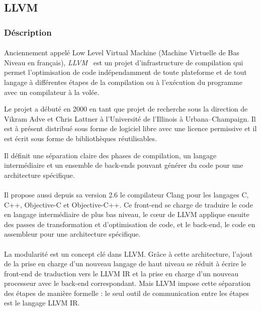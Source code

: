 \subsection{LLVM}
\subsubsection{Déscription}
\paragraph{}
\sloppy
Anciennement appelé \og{} Low Level Virtual Machine \fg{} (Machine Virtuelle de
Bas Niveau en français), \emph{LLVM}~\cite{llvm} est un projet d'infrastructure
de compilation qui permet l'optimisation de code indépendamment de toute
plateforme et de tout langage à différentes étapes de la compilation ou à
l'exécution du programme avec un compilateur à la volée.

Le projet a débuté en 2000 en tant que projet de recherche sous la direction de
Vikram Adve et Chris Lattner à l'Université de l'Illinois à Urbana–Champaign. Il
est à présent distribué sous forme de logiciel libre avec une licence permissive
et il est écrit sous forme de bibliothèques réutilisables.

Il définit une séparation claire des phases de compilation, un langage
intermédiaire et un ensemble de back-ends pouvant générer du code pour une
architecture spécifique.

\paragraph{}
Il propose aussi depuis sa version 2.6 le compilateur Clang pour les langages C,
C++, Objective-C et Objective-C++. Ce front-end se charge de traduire le code en
langage intermédiaire de plus bas niveau, le c\oe{}ur de LLVM applique ensuite
des passes de transformation et d'optimisation de code, et le back-end, le code
en assembleur pour une architecture spécifique.

\paragraph{}
La modularité est un concept clé dans LLVM. Grâce à cette architecture, l'ajout
de la prise en charge d'un nouveau langage de haut niveau se réduit à écrire le
front-end de traduction vers le LLVM IR et la prise en charge d'un nouveau
processeur avec le back-end correspondant. Mais LLVM impose cette séparation des
étapes de manière formelle : le seul outil de communication entre les étapes est
le langage LLVM IR.

